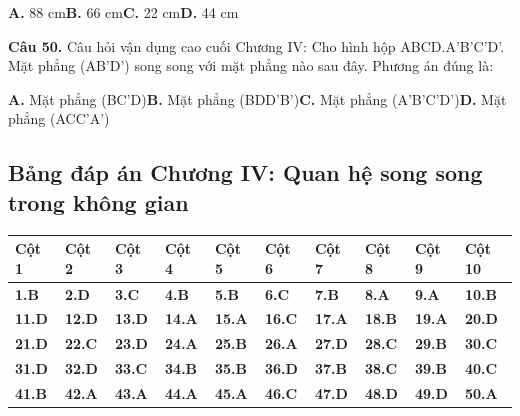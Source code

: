 \documentclass[11pt,a4paper]{article}
\begin{document}
\hspace*{1.5em}\textbf{A.} 88 cm\quad\quad \textbf{B.} 66 cm\quad\quad \textbf{C.} 22 cm\quad\quad \textbf{D.} 44 cm\par\vspace{2pt}
\textbf{\color{primary} Câu 50.} Câu hỏi vận dụng cao cuối Chương IV: Cho hình hộp ABCD.A'B'C'D'. Mặt phẳng (AB'D') song song với mặt phẳng nào sau đây. Phương án đúng là:\par
\hspace*{1.5em}\textbf{A.} Mặt phẳng (BC'D)\quad\quad \textbf{B.} Mặt phẳng (BDD'B')\quad\quad \textbf{C.} Mặt phẳng (A'B'C'D')\quad\quad \textbf{D.} Mặt phẳng (ACC'A')\par\vspace{2pt}
\subsection*{\color{primary} Bảng đáp án Chương IV: Quan hệ song song trong không gian}
\begin{center}
\renewcommand{\arraystretch}{1.25}
\begin{tabularx}{\textwidth}{*{10}{>{\centering\arraybackslash}X}}
\toprule
\textbf{\color{primary} Cột 1} & \textbf{\color{primary} Cột 2} & \textbf{\color{primary} Cột 3} & \textbf{\color{primary} Cột 4} & \textbf{\color{primary} Cột 5} & \textbf{\color{primary} Cột 6} & \textbf{\color{primary} Cột 7} & \textbf{\color{primary} Cột 8} & \textbf{\color{primary} Cột 9} & \textbf{\color{primary} Cột 10} \\
\midrule
\textbf{1.B} & \textbf{2.D} & \textbf{3.C} & \textbf{4.B} & \textbf{5.B} & \textbf{6.C} & \textbf{7.B} & \textbf{8.A} & \textbf{9.A} & \textbf{10.B} \\
\rowcolor{rowtint} \textbf{11.D} & \textbf{12.D} & \textbf{13.D} & \textbf{14.A} & \textbf{15.A} & \textbf{16.C} & \textbf{17.A} & \textbf{18.B} & \textbf{19.A} & \textbf{20.D} \\
\textbf{21.D} & \textbf{22.C} & \textbf{23.D} & \textbf{24.A} & \textbf{25.B} & \textbf{26.A} & \textbf{27.D} & \textbf{28.C} & \textbf{29.B} & \textbf{30.C} \\
\rowcolor{rowtint} \textbf{31.D} & \textbf{32.D} & \textbf{33.C} & \textbf{34.B} & \textbf{35.B} & \textbf{36.D} & \textbf{37.B} & \textbf{38.C} & \textbf{39.B} & \textbf{40.C} \\
\textbf{41.B} & \textbf{42.A} & \textbf{43.A} & \textbf{44.A} & \textbf{45.A} & \textbf{46.C} & \textbf{47.D} & \textbf{48.D} & \textbf{49.D} & \textbf{50.A} \\
\bottomrule
\end{tabularx}
\end{center}\vspace{10pt}
\end{document}
